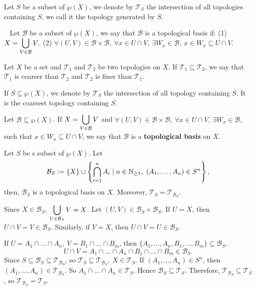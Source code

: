 \begin{definitionenv}
    Let $S$ be a subset of $\wp(X)$, we denote by $\mathscr{T}_S$ the intersection of all topologies containing $S$, we call it the topology generated by $S$. 
\end{definitionenv}
\begin{definitionenv}
    \ \newline
    Let $\mathcal{B}$ be a subset of $\wp(X)$, we say that $\mathcal{B}$ is a topological basis if:
    \newline
    (1) $\displaystyle X=\bigcup_{V\in \mathcal{B}}V$.
    \newline
    (2) $\forall (U,V)\in \mathcal{B}\times\mathcal{B},\ \forall x\in U\cap V,\ \exists W_x\in \mathcal{B},\ x\in W_x\subseteq U\cap V$.
\end{definitionenv}
\begin{definitionenv}
    Let $X$ be a set and $\mathscr{T}_1$ and $\mathscr{T}_2$ be two topologies on $X$. If $\mathscr{T}_1\subseteq\mathscr{T}_2$, we say that $\mathscr{T}_1$ is coarser than $\mathscr{T}_2$ and $\mathscr{T}_2$ is finer than $\mathscr{T}_1$. 
    
    If $S\subseteq\wp(X)$, we denote by $\mathscr{T}_S$ the intersection of all topology containing $S$. It is the coarsest topology containing $S$. 
    
    Let  $\mathcal{B}\subseteq \wp(X)$. If $\displaystyle X=\bigcup_{V\in \mathcal{B}}V$ and $\forall (U,V)\in \mathcal{B}\times\mathcal{B},\ \forall x\in U\cap V,\ \exists W_x\in \mathcal{B},$ such that $x\in W_x\subseteq U\cap V$, we say that $\mathcal{B}$ is a \textbf{topological basis} on $X$.
\end{definitionenv}
\begin{propositionenv}
    Let $S$ be s subset of $\wp(X)$. Let 
    $$\mathcal{B}_S:=\{X\}\cup\left\{\bigcap_{i=1}^{n}A_i\mid n\in \mathbb{N}_{\ge 1},\ (A_1,\dots,A_n)\in S^n\right\},$$
    then, $\mathcal{B}_S$ is a topological basis on $X$. Moreover, $\mathscr{T}_S=\mathscr{T}_{\mathcal{B}_S}$.
\end{propositionenv}
\begin{proofenv}
    Since $X\in \mathcal{B}_S$, $\displaystyle\bigcup_{V\in \mathcal{B}_S}V=X$. Let $(U,V)\in \mathcal{B}_S\times\mathcal{B}_S$. If $U=X$, then $U\cap V=V\in \mathcal{B}_S$. Similarly, if $V=X$, then $U\cap V=U\in \mathcal{B}_S$. 

    If $U=A_1\cap\dots\cap A_n,\ V=B_1\cap\dots\cap B_m$, then $\{A_1,\dots, A_n,B_1,\dots,B_m\}\subseteq \mathcal{B}_S$. 
    $$U\cap V=A_1\cap\dots\cap A_n\cap B_1\cap\dots\cap B_m\in \mathcal{B}_S.$$
    Since $S\subseteq\mathcal{B}_S\subseteq\mathscr{T}_{\mathcal{B}_S}$, so $\mathscr{T}_{S}\subseteq\mathscr{T}_{\mathcal{B}_S}, \ X\in \mathscr{T}_S$. If $(A_1,\dots,A_n)\in S^n$, then $(A_1,\dots,A_n)\in\mathscr{T}_{\mathcal{B}_S}$. So $A_1\cap\dots\cap A_n\in \mathscr{T}_S$. Hence $\mathcal{B}_S\subseteq\mathscr{T}_{S}$. Therefore, $\mathscr{T}_{\mathcal{B}_S}\subseteq\mathscr{T}_S$, so $\mathscr{T}_{\mathcal{B}_S}=\mathscr{T}_S$.
\end{proofenv}
